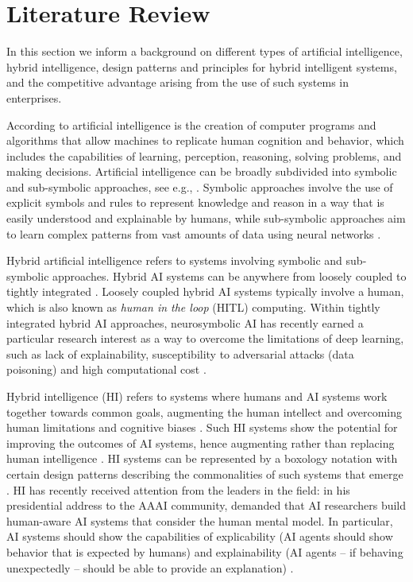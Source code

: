 \section{Literature Review}
\label{sec:literature}

In this section we inform a background on different types of artificial intelligence, hybrid intelligence, 
design patterns and principles for hybrid intelligent systems, and the competitive advantage arising from
the use of such systems in enterprises.

According to \cite{russel2010} artificial intelligence is the creation of computer programs and algorithms
that allow machines to replicate human cognition and behavior, which includes the capabilities of learning, perception,
reasoning, solving problems, and making decisions. Artificial intelligence can be broadly subdivided into symbolic
and sub-symbolic approaches, see e.g., \cite{eliasmithSymbolicSubsymbolic2006}. Symbolic approaches involve the 
use of explicit symbols and rules to represent knowledge and reason in a way that is easily understood and explainable
by humans, while sub-symbolic approaches aim to learn complex patterns from vast amounts of data using neural networks
\citep{ilkouSymbolicVsSubsymbolic2020}.

Hybrid artificial intelligence refers to systems involving symbolic and sub-symbolic approaches. Hybrid AI systems
can be anywhere from loosely coupled to tightly integrated \citep{garcezNeurosymbolicAI3rd2020}. Loosely coupled
hybrid AI systems typically involve a human, which is also known as \textit{human in the loop} (HITL) computing. Within
tightly integrated hybrid AI approaches, neurosymbolic AI has recently earned a particular research interest as a way to
overcome the limitations of deep learning, such as lack of explainability, susceptibility to adversarial attacks
(data poisoning) and high computational cost \citep{garcezNeurosymbolicAI3rd2020}.

Hybrid intelligence (HI) refers to systems where humans and AI systems work together towards common
goals, augmenting the human intellect and overcoming human limitations and cognitive biases \citep{akataResearchAgendaHybrid2020}.
Such HI systems show the  potential for improving the outcomes of AI systems, hence augmenting rather than replacing
human intelligence \cite[p. 19]{akataResearchAgendaHybrid2020}. HI systems can be represented by a boxology notation with certain
design patterns describing the commonalities of such systems that emerge \citep{harmelenBoxologyDesignPatterns2019,
vanbekkumModularDesignPatterns2021,witschelVisualizationPatternsHybrid2021}. HI has recently received attention from
the leaders in the field: in his presidential address to the AAAI community, 
\cite{kambhampatiChallengesHumanAwareAI2020} demanded that AI researchers build human-aware AI systems that consider the 
human mental model. In particular, AI systems should show the capabilities of explicability (AI agents should show
behavior that is expected by humans) and explainability (AI agents -- if behaving unexpectedly -- should be able to provide
an explanation) \citep{kambhampatiChallengesHumanAwareAI2020}.


